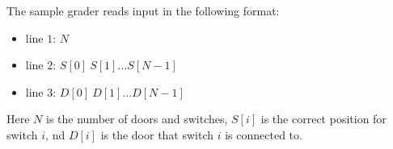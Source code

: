 The sample grader reads input in the following format:
\begin{itemize}
\item line $1$: $N$
\item line $2$: $S[0]\ S[1]\dots S[N­ - 1]$
\item line $3$: $D[0]\ D[1]\dots D[N­ - 1]$
\end{itemize}


Here $N$ is the number of doors and switches, $S[i]$ is the correct position for switch $i$, nd $D[i]$ is the door that switch $i$ is connected to.

